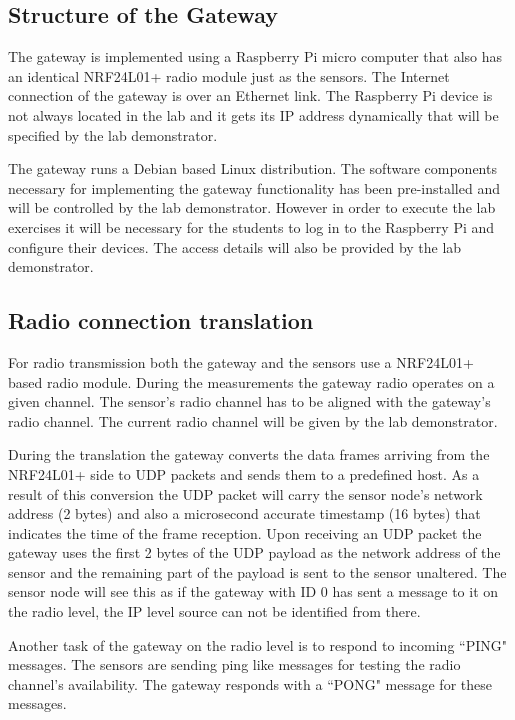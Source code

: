 \documentclass[a4paper]{article}
\begin{document}
\subsection{Structure of the Gateway}

The gateway is implemented using a Raspberry Pi micro computer that also has an identical NRF24L01+
radio module just as the sensors. The Internet connection of the gateway is over an Ethernet link.
The Raspberry Pi device is not always located in the lab and it gets its IP address dynamically
that will be specified by the lab demonstrator.

The gateway runs a Debian based Linux distribution. The software components necessary for
implementing the gateway functionality has been pre-installed and will be controlled by the
lab demonstrator. However in order to execute the lab exercises it will be necessary for the students
to log in to the Raspberry Pi and configure their devices. The access details will also be provided
by the lab demonstrator.

\subsection{Radio connection translation}

For radio transmission both the gateway and the sensors use a NRF24L01+ based radio module.
During the measurements the gateway radio operates on a given channel. The sensor's radio
channel has to be aligned with the gateway's radio channel. The current radio channel will be
given by the lab demonstrator.

During the translation the gateway converts the data frames arriving from the NRF24L01+ side 
to UDP packets and sends them to a predefined host. As a result of this conversion the
UDP packet will carry the sensor node's network address (2 bytes) and also a microsecond accurate
timestamp (16 bytes) that indicates the time of the frame reception.
Upon receiving an UDP packet the gateway uses the first 2 bytes of the UDP payload as the
network address of the sensor and the remaining part of the payload is sent to the sensor unaltered.
The sensor node will see this as if the gateway with ID 0 has sent a message to it on the radio level, the IP level source
can not be identified from there.

Another task of the gateway on the radio level is to respond to incoming ``PING" messages. 
The sensors are sending ping like messages for testing the radio channel's availability.
The gateway responds with a ``PONG" message for these messages.
\end{document}
